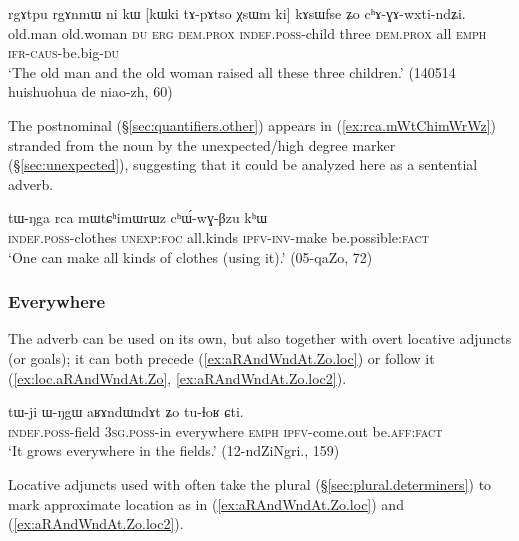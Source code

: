 \begin{exe}
\ex \label{ex:XsWm.kAsWfse}
 \gll rgɤtpu rgɤnmɯ ni kɯ [kɯki tɤ-pɤtso χsɯm ki] kɤsɯfse ʑo cʰɤ-ɣɤ-wxti-ndʑi. \\
 old.man old.woman \textsc{du} \textsc{erg} \textsc{dem}.\textsc{prox} \textsc{indef}.\textsc{poss}-child three \textsc{dem}.\textsc{prox} all \textsc{emph} \textsc{ifr}-\textsc{caus}-be.big-\textsc{du} \\
\glt `The old man and the old woman raised all these three children.' (140514 huishuohua de niao-zh, 60)
\end{exe}
  

The postnominal  (§\ref{sec:quantifiers.other}) appears in (\ref{ex:rca.mWtChimWrWz}) stranded from the noun  by the unexpected/high degree marker  (§\ref{sec:unexpected}), suggesting that it could be analyzed here as a sentential adverb.

\begin{exe}
\ex \label{ex:rca.mWtChimWrWz}
\gll tɯ-ŋga rca mɯtɕʰimɯrɯz cʰɯ́-wɣ-βzu kʰɯ \\
\textsc{indef}.\textsc{poss}-clothes \textsc{unexp}:\textsc{foc} all.kinds \textsc{ipfv}-\textsc{inv}-make be.possible:\textsc{fact} \\
\glt `One can make all kinds of clothes (using it).' (05-qaZo, 72)
\end{exe}

 
 
\subsubsection{Everywhere} \label{sec:everywhere}
The adverb  can be used on its own, but also together with overt locative adjuncts (or goals); it can both precede (\ref{ex:aRAndWndAt.Zo.loc}) or follow it  (\ref{ex:loc.aRAndWndAt.Zo}, \ref{ex:aRAndWndAt.Zo.loc2}). 

 \begin{exe}
\ex \label{ex:loc.aRAndWndAt.Zo}
\gll tɯ-ji ɯ-ŋgɯ aʁɤndɯndɤt ʑo tu-ɬoʁ ɕti. \\
\textsc{indef}.\textsc{poss}-field \textsc{3sg}.\textsc{poss}-in everywhere \textsc{emph} \textsc{ipfv}-come.out be.\textsc{aff}:\textsc{fact} \\
\glt `It grows everywhere in the fields.' (12-ndZiNgri., 159)
\end{exe} 

Locative adjuncts used with  often take the plural  (§\ref{sec:plural.determiners}) to mark approximate location as in (\ref{ex:aRAndWndAt.Zo.loc}) and (\ref{ex:aRAndWndAt.Zo.loc2}).


